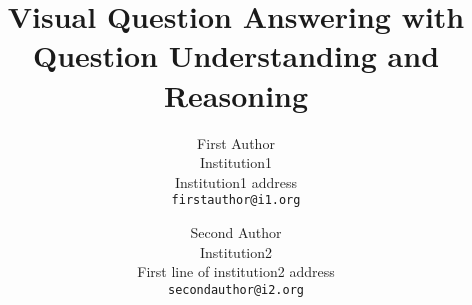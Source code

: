 \documentclass[10pt,twocolumn,letterpaper]{article}
\begin{document}
\title{Visual Question Answering with Question Understanding and Reasoning}

\author{First Author\\
Institution1\\
Institution1 address\\
{\tt\small firstauthor@i1.org}
\and
Second Author\\
Institution2\\
First line of institution2 address\\
{\tt\small secondauthor@i2.org}
}

\maketitle
\end{document}
